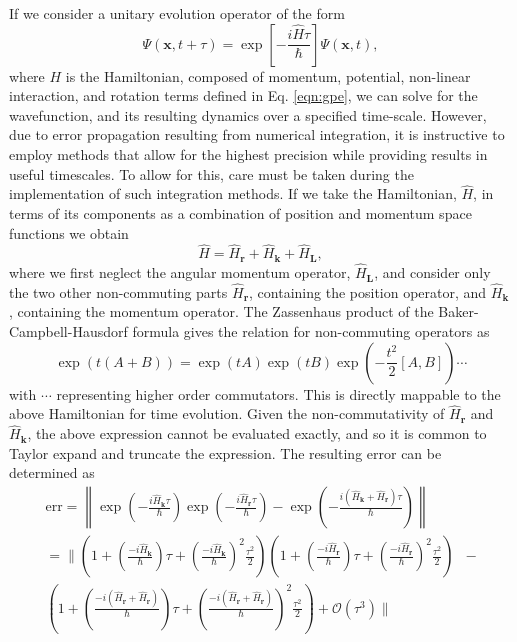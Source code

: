 If we consider a unitary evolution operator of the form
\begin{equation}\label{eqn:1}
\Psi(\mathbf{x},t+\tau) = \exp\left[ -\frac{i\hat{H}\tau}{\hbar}\right]\Psi(\mathbf{x},t),
\end{equation}
where $H$ is the Hamiltonian, composed of momentum, potential, non-linear interaction, and rotation terms defined in Eq. \eqref{eqn:gpe}, we can solve for the wavefunction, and its resulting dynamics over a specified time-scale. However, due to error propagation resulting from numerical integration, it is instructive to employ methods that allow for the highest precision while providing results in useful timescales. To allow for this, care must be taken during the implementation of such integration methods.  If we take the Hamiltonian, $\hat{H}$, in terms of its components as a combination of position and momentum space functions we obtain
\begin{equation}\label{eqn:2}
\hat{H} = \hat{H}_{\textbf{r}} + \hat{H}_{\textbf{k}} + \hat{H}_{\textbf{L}},
\end{equation}
where we first neglect the angular momentum operator, $\hat{H}_{\textbf{L}}$, and consider only the two other non-commuting parts $\hat{H}_{\textbf{r}}$, containing the position operator, and $\hat{H}_{\textbf{k}}$, containing the momentum operator. The Zassenhaus product of the Baker-Campbell-Hausdorf formula \cite{some citation} gives the relation for non-commuting operators as
\begin{equation}
    \exp\left( t(A+B) \right) = \exp\left(tA\right)\exp\left(tB\right)\exp\left(-\frac{t^2}{2}[A,B]\right)\cdots
\end{equation}
with $\cdots$ representing higher order commutators. This is directly mappable to the above Hamiltonian for time evolution. Given the non-commutativity of $\hat{H}_{\textbf{r}}$ and $\hat{H}_{\textbf{k}}$, the above expression cannot be evaluated exactly, and so it is common to Taylor expand and truncate the expression. The resulting error can be determined as
\begin{subequations}\label{eqn:error_calc}
\begin{align}
    \text{err} = \left\| \exp\left(-\frac{i\hat{H}_{\textbf{k}}\tau}{\hbar}\right)\exp\left(-\frac{i\hat{H}_{\textbf{r}}\tau}{\hbar}\right) - \exp\left(-\frac{i(\hat{H}_{\textbf{k}} + \hat{H}_{\textbf{r}})\tau}{\hbar}\right) \right\| \\
    = {\Biggl\|}  \left(1 + \left(\frac{-i\hat{H}_{\textbf{k}}}{\hbar}\right)\tau + \left(\frac{-i\hat{H}_{\textbf{k}}}{\hbar}\right)^2\frac{\tau^2}{2}  \right)\left(1 + \left(\frac{-i\hat{H}_{\textbf{r}}}{\hbar}\right)\tau + \left(\frac{-i\hat{H}_{\textbf{r}}}{\hbar}\right)^2\frac{\tau^2}{2}  \right) &-\\ \left(1 + \left(\frac{-i(\hat{H}_{\textbf{r}} + \hat{H}_{\textbf{r}})}{\hbar}\right)\tau + \left(\frac{-i(\hat{H}_{\textbf{r}} + \hat{H}_{\textbf{r}})}{\hbar}\right)^2\frac{\tau^2}{2}  \right)  + \mathcal{O}(\tau^3) {\Biggr\|}
\end{align}
\end{subequations}
